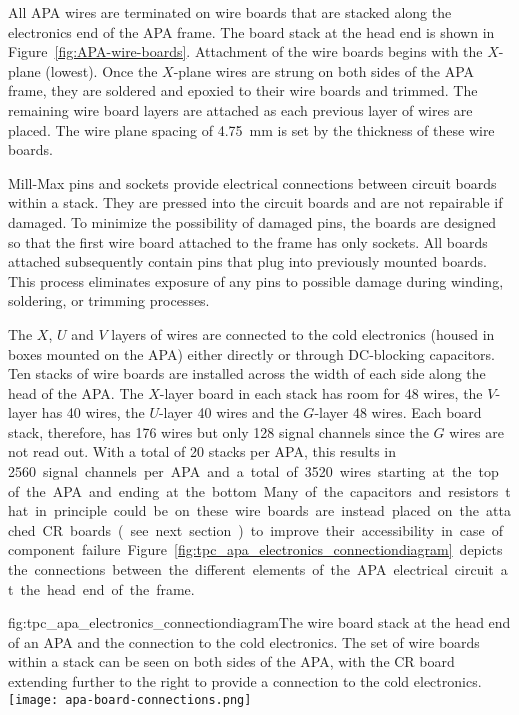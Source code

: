 All APA wires are terminated on wire boards that are stacked along the electronics end of the APA frame.  The board stack at the head end is shown in Figure~\ref{fig:APA-wire-boards}. Attachment of the wire boards begins with the $X$-plane (lowest). Once the $X$-plane wires are strung on both sides of the APA frame, they are soldered and epoxied to their wire boards and trimmed. The remaining wire board layers are attached as each previous layer of wires are placed.  The wire plane spacing of \SI{4.75}{mm} is set by the thickness of these wire boards.   

Mill-Max pins and sockets provide electrical connections between circuit boards within a stack. They are pressed into the circuit boards and are not repairable if damaged. To minimize the possibility of damaged pins, the boards are designed so that the first wire board attached to the frame has only sockets. All boards attached subsequently contain pins that plug into previously mounted boards. This process eliminates exposure of any pins to possible damage during winding, soldering, or trimming processes.

The $X$, $U$ and $V$ layers of wires are connected to the cold electronics (housed in boxes mounted on the APA) either directly or through DC-blocking capacitors.  Ten stacks of wire boards are installed across the width of each side along the head of the APA.  The $X$-layer board in each stack has room for 48 wires, the $V$-layer has 40 wires, the $U$-layer 40 wires and the $G$-layer 48 wires.  Each board stack, therefore, has 176 wires but only 128 signal channels since the $G$ wires are not read out. With a total of 20 stacks per APA, this results in \SI{2560} signal channels per APA and a total of \SI{3520} wires starting at the top of the APA and ending at the bottom. Many of the capacitors and resistors that in principle could be on these wire boards are instead placed on the attached CR boards (see next section) to improve their accessibility in case of component failure. Figure~\ref{fig:tpc_apa_electronics_connectiondiagram} depicts the connections between the different elements of the APA electrical circuit at the head end of the frame. 

\begin{dunefigure}{fig:tpc_apa_electronics_connectiondiagram}{The wire board stack at the head end of an APA and the connection to the cold electronics. The set of wire boards within a stack can be seen on both sides of the APA, with the CR board extending further to the right to provide a connection to the cold electronics.}
\setlength{\fboxsep}{0pt}
\setlength{\fboxrule}{0.5pt}
\texttt{[image: apa-board-connections.png]}
\end{dunefigure} 


